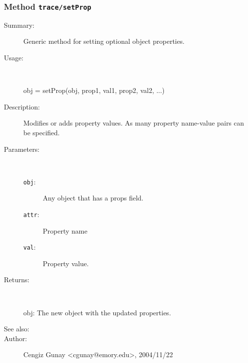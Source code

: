 \subsubsection[Method \texttt{setProp}]{Method \texttt{trace/setProp}}%
%
\label{ref_trace__setProp}%
\hypertarget{ref_trace__setProp}{}%
\begin{description}
\item[Summary:]Generic method for setting optional object properties.
%
\item[Usage:]~%
\begin{lyxcode}%
obj = setProp(obj, prop1, val1, prop2, val2, ...)
%
\end{lyxcode}%
%
\item[Description:]%
Modifies or adds property values. As many property name-value 
 pairs can be specified.
\item[Parameters:]~
\begin{description}%
\item[\texttt{obj}:]
 Any object that has a props field.
\item[\texttt{attr}:]
 Property name
\item[\texttt{val}:]
 Property value.
\end{description}%
%
\item[Returns:
]~

	obj: The new object with the updated properties.
%
%
\item[See also:]%
%
\item[Author:]%
Cengiz Gunay <cgunay@emory.edu>, 2004/11/22
%
\end{description}
\methodline%
